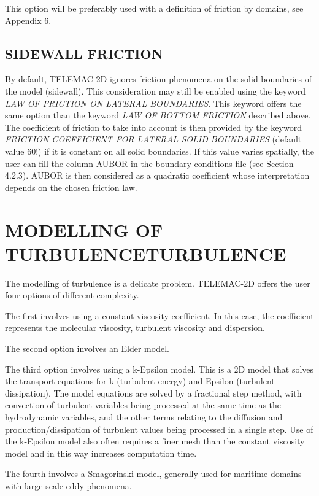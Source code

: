  This option will be preferably used with a definition of friction by domains, see Appendix 6.


\subsection{ SIDEWALL FRICTION}

 By default, TELEMAC-2D ignores friction phenomena on the solid boundaries of the model (sidewall). This consideration may still be enabled using the keyword \textit{LAW OF FRICTION ON LATERAL BOUNDARIES}. 
This keyword offers the same option than the keyword \textit{LAW OF BOTTOM FRICTION} described above. The coefficient of friction to take into account is then provided by the keyword \textit{FRICTION COEFFICIENT FOR LATERAL SOLID BOUNDARIES} (default value 60!) if it is constant on all solid boundaries. If this value varies spatially, the user can fill the column AUBOR in the boundary conditions file (see Section 4.2.3). AUBOR is then considered as a quadratic coefficient whose interpretation depends on the chosen friction law.


\section{ MODELLING OF TURBULENCETURBULENCE}

 The modelling of turbulence is a delicate problem. TELEMAC-2D offers the user four options of different complexity.

 The first involves using a constant viscosity coefficient. In this case, the coefficient represents the molecular viscosity, turbulent viscosity and dispersion.

 The second option involves an Elder model.

 The third option involves using a k-Epsilon model. This is a 2D model that solves the transport equations for k (turbulent energy) and Epsilon (turbulent dissipation). The model equations are solved by a fractional step method, with convection of turbulent variables being processed at the same time as the hydrodynamic variables, and the other terms relating to the diffusion and production/dissipation of turbulent values being processed in a single step. Use of the k-Epsilon model also often requires a finer mesh than the constant viscosity model and in this way increases computation time.

 The fourth involves a Smagorinski model, generally used for maritime domains with large-scale eddy phenomena.

